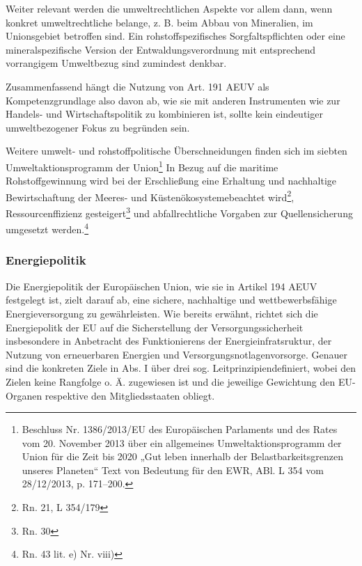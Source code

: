 \documentclass[12pt,a4paper,oneside]{book} %
\begin{document}
Weiter relevant werden die umweltrechtlichen Aspekte vor allem dann, wenn konkret umweltrechtliche belange, z. B. beim Abbau von Mineralien, im Unionsgebiet betroffen sind. Ein rohstoffspezifisches Sorgfaltspflichten oder eine mineralspezifische Version der Entwaldungsverordnung mit entsprechend vorrangigem Umweltbezug sind zumindest denkbar.
	
Zusammenfassend hängt die Nutzung von Art. 191 AEUV als Kompetenzgrundlage also davon ab, wie sie mit anderen Instrumenten wie zur Handels- und Wirtschaftspolitik zu kombinieren ist, sollte kein eindeutiger umweltbezogener Fokus zu begründen sein.

Weitere umwelt- und rohstoffpolitische Überschneidungen finden sich im siebten Umweltaktionsprogramm der Union\footnote{Beschluss Nr. 1386/2013/EU des Europäischen Parlaments und des Rates vom 20. November 2013 über ein allgemeines Umweltaktionsprogramm der Union für die Zeit bis 2020 „Gut leben innerhalb der Belastbarkeitsgrenzen unseres Planeten“ Text von Bedeutung für den EWR, ABl. L 354 vom 28/12/2013, p. 171–200.} In Bezug auf die maritime Rohstoffgewinnung wird bei der Erschließung eine \glqq Erhaltung und nachhaltige Bewirtschaftung der Meeres- und Küstenökosysteme\glqq beachtet wird\footnote{Rn. 21, L 354/179}, Ressourcenffizienz gesteigert\footnote{Rn. 30} und abfallrechtliche Vorgaben zur Quellensicherung umgesetzt werden.\footnote{Rn. 43 lit. e) Nr. viii)}
	
	
	
	
\subsubsection{Energiepolitik}
Die Energiepolitik der Europäischen Union, wie sie in Artikel 194 AEUV festgelegt ist, zielt darauf ab, eine sichere, nachhaltige und wettbewerbsfähige Energieversorgung zu gewährleisten. Wie bereits erwähnt, richtet sich die Energiepolitk der EU auf die Sicherstellung der Versorgungssicherheit insbesondere in Anbetracht des Funktionierens der Energieinfratsruktur, der Nutzung von erneuerbaren Energien und Versorgungsnotlagenvorsorge.\autocite[387]{frau_rohstoffe_2025} Genauer sind die konkreten Ziele in Abs. I über drei sog. \glqq Leitprinzipien\grqq definiert, wobei den Zielen keine Rangfolge o. Ä. zugewiesen ist und die jeweilige Gewichtung den EU-Organen respektive den Mitgliedsstaaten obliegt.\autocite[Gundel § M Rn. 26 27]{dauses_handbuch_2024} 
\end{document}
